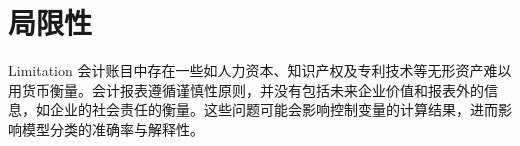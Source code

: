 \section{局限性}{Limitation}
会计账目中存在一些如人力资本、知识产权及专利技术等无形资产难以用货币衡量。会计报表遵循谨慎性原则，并没有包括未来企业价值和报表外的信息，如企业的社会责任的衡量。这些问题可能会影响控制变量的计算结果，进而影响模型分类的准确率与解释性。

















































